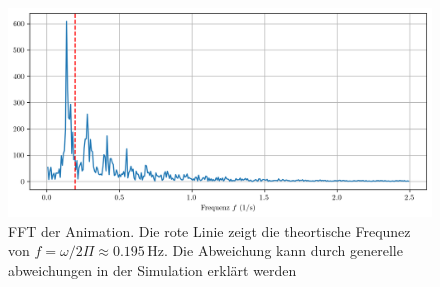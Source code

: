 \begin{figure}
    \centering
    \includegraphics[width=\linewidth]{papers/reaktdiff/images/LotkaVolterra/fft_plot_latex.png}
    \caption{FFT der Animation. Die rote Linie zeigt die theortische Frequnez von \(f = \omega / 2 \Pi \approx 0.195\,\text{Hz}\). Die Abweichung kann durch generelle abweichungen in der Simulation erklärt werden}
    \label{reaktdiff:fig:lvfft}
\end{figure}





